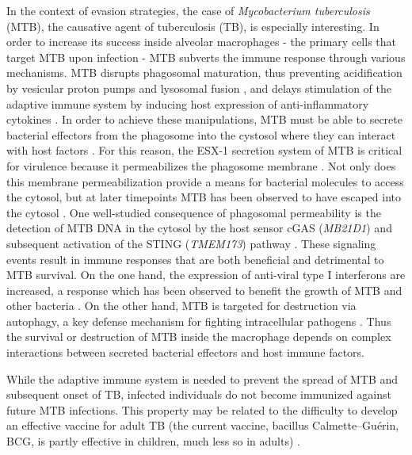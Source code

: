 In the context of evasion strategies, the case of \emph{Mycobacterium
tuberculosis} (MTB), the causative agent of tuberculosis (TB), is
especially interesting. In order to increase its success inside alveolar
macrophages - the primary cells that target MTB upon infection - MTB
subverts the immune response through various mechanisms. MTB disrupts
phagosomal maturation, thus preventing acidification by vesicular proton
pumps and lysosomal fusion \citep{Sturgill-Koszycki1994, Hornef2002;
@Hestvik2005}, and delays stimulation of the adaptive immune system by
inducing host expression of anti-inflammatory cytokines
\citep{VanHeyningen1997, Giacomini2001}. In order to achieve these
manipulations, MTB must be able to secrete bacterial effectors from the
phagosome into the cystosol where they can interact with host factors
\citep{Stanley2013}. For this reason, the ESX-1 secretion system of MTB
is critical for virulence because it permeabilizes the phagosome
membrane \citep{VanderWel2007, Simeone2015}. Not only does this membrane
permeabilization provide a means for bacterial molecules to access the
cytosol, but at later timepoints MTB has been observed to have escaped
into the cytosol \citep{Stanley2013}. One well-studied consequence of
phagosomal permeability is the detection of MTB DNA in the cytosol by
the host sensor cGAS (\emph{MB21D1}) and subsequent activation of the
STING (\emph{TMEM173}) pathway \citep{Dey2015, Collins2015, Watson2015;
@Wassermann2015}. These signaling events result in immune responses
that are both beneficial and detrimental to MTB survival. On the one
hand, the expression of anti-viral type I interferons are increased, a
response which has been observed to benefit the growth of MTB and other
bacteria \citep{Stanley2007}. On the other hand, MTB is targeted for
destruction via autophagy, a key defense mechanism for fighting
intracellular pathogens \citep{Watson2012}. Thus the survival or
destruction of MTB inside the macrophage depends on complex interactions
between secreted bacterial effectors and host immune factors.

While the adaptive immune system is needed to prevent the spread of MTB
and subsequent onset of TB, infected individuals do not become immunized
against future MTB infections. This property may be related to the
difficulty to develop an effective vaccine for adult TB (the current
vaccine, bacillus Calmette--Guérin, BCG, is partly effective in
children, much less so in adults) \citep{Wang2013}.

